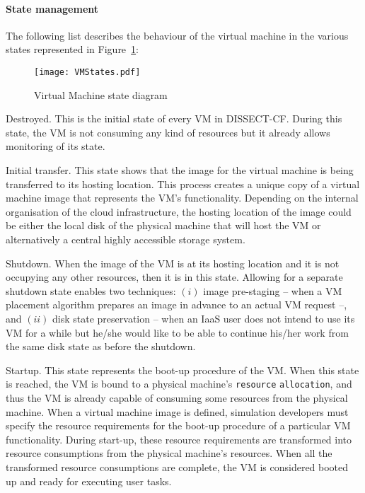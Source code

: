 \documentclass[sort, compress, 5p]{elsarticle}
\begin{document}
\paragraph{State management} The following list describes the behaviour of the virtual machine in the various states represented in Figure~\ref{FIG-VMStates}:
\begin{figure}[tb]
\centering
\texttt{[image: VMStates.pdf]}
\caption{Virtual Machine state diagram\label{FIG-VMStates}}
\end{figure}

\begin{description*}
\item[Destroyed.] This is the initial state of every VM in DISSECT-CF. During this state, the VM is not consuming any kind of resources but it already allows monitoring of its state.
\item[Initial transfer.] This state shows that the image for the virtual machine is being transferred to its hosting location. This process creates a unique copy of a virtual machine image that represents the VM's functionality. Depending on the internal organisation of the cloud infrastructure, the hosting location of the image could be either the local disk of the physical machine that will host the VM or alternatively a central highly accessible storage system.
\item[Shutdown.] When the image of the VM is at its hosting location and it is not occupying any other resources, then it is in this state. Allowing for a separate shutdown state enables two  techniques: $(i)$ image pre-staging -- when a VM placement algorithm prepares an image in advance to an actual VM request --, and $(ii)$ disk state preservation -- when an IaaS user does not intend to use its VM for a while but he/she would like to be able to continue his/her work from the same disk state as before the shutdown. 
\item[Startup.] This state represents the boot-up procedure of the VM. When this state is reached, the VM is bound to a physical machine's \verb+resource+ \verb+allocation+, and thus the VM is already capable of consuming some resources from the physical machine. When a virtual machine image is defined, simulation developers must specify the resource requirements for the boot-up procedure of a particular VM functionality. During start-up, these resource requirements are transformed into resource consumptions from the physical machine's resources. When all the transformed resource consumptions are complete, the VM is considered booted up and ready for executing user tasks.

\end{description*}
\end{document}
